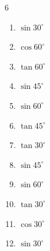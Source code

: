 \begin{multicols}{6}
\begin{enumerate}

\columnbreak %

  \item $\displaystyle \sin{30^\circ}$


  \item $\displaystyle \cos{60^\circ}$


  \item $\displaystyle \tan{60^\circ}$


  \item $\displaystyle \sin{45^\circ}$


  \item $\displaystyle \sin{60^\circ}$


  \item $\displaystyle \tan{45^\circ}$

        \phantom{$\displaystyle =1$}

  \item $\displaystyle \tan{30^\circ}$


  \item $\displaystyle \sin{45^\circ}$


  \item $\displaystyle \sin{60^\circ}$


  \item $\displaystyle \tan{30^\circ}$


  \item $\displaystyle \cos{30^\circ}$


  \item $\displaystyle \sin{30^\circ}$



\end{enumerate}
\end{multicols}
